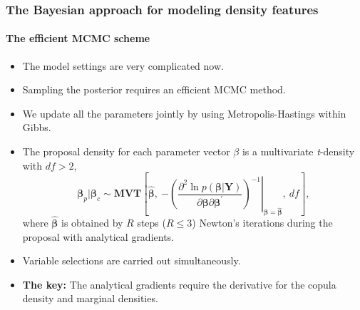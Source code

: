 \documentclass[11pt]{beamer}
\begin{document}
\begin{frame}
  \frametitle{The Bayesian approach for modeling density features}
  \framesubtitle{The efficient MCMC scheme}

  \begin{itemize}

  \item The model settings are very complicated now.

  \item Sampling the posterior requires an efficient MCMC method.

  \item We update all the parameters jointly by using
    Metropolis-Hastings within Gibbs.
  \item The proposal density for each parameter vector $\beta$ is a multivariate \emph{t}-density with  $df>2$,
    \[
    \bm{\beta}_{p} |\bm{\beta}_{c}\sim\bm{MVT}\left[\bm{\hat{\beta}},~\left.-\left(\frac{\partial^{2}\ln
            p(\bm{\beta}|\bm{Y})}{\partial\bm{\beta}\partial\bm{\beta}^{\prime}}\right)^{-1}\right\vert
      _{\bm{\beta}=\bm{\hat{\beta}}},~df\right],
    \]
    where $\bm{\hat{\beta}}$ is obtained by $R$ steps ($R\leq 3$) Newton's
    iterations during the proposal with analytical gradients.

  \item Variable selections are carried out simultaneously.

  \item \textbf{The key:} The analytical gradients require the derivative for
    the copula density and marginal densities.


  \end{itemize}

\end{frame}
\end{document}
